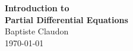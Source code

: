 \documentclass[a4paper,10pt,preprint,aps,tightenlines,showpacs,superscriptaddress]{revtex4}	%
\theoremstyle{definition}
\begin{document}
\begin{titlepage}
   \begin{center}
      \Huge\textbf{Introduction to\\Partial Differential Equations}\\
      \text{ }\newline
      \large{Baptiste Claudon}\\
      \today
   \end{center}
\end{titlepage}

\tableofcontents\newpage
\newpage

\end{document}
